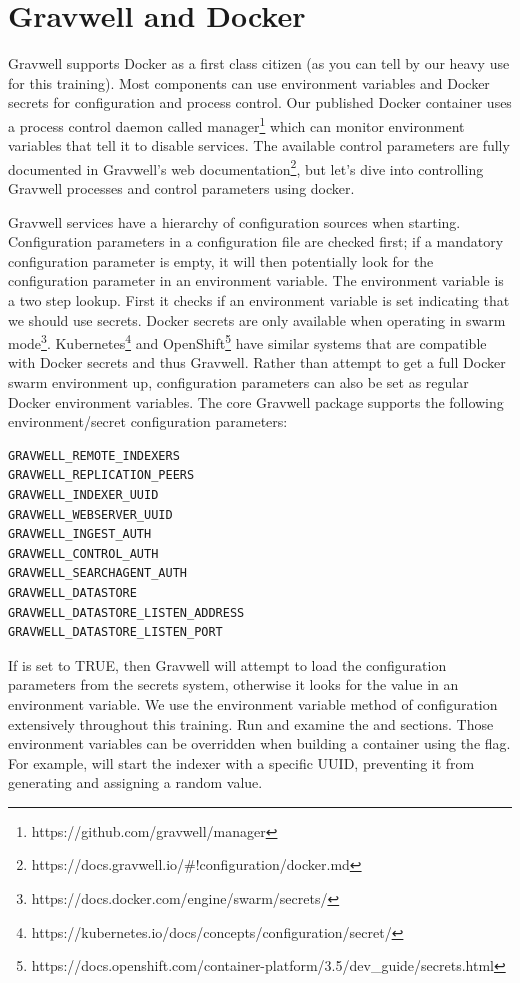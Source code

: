 {\section{Gravwell and Docker}
Gravwell supports Docker as a first class citizen (as you can tell by
our heavy use for this training). Most components can use environment
variables and Docker secrets for configuration and process control. Our
published Docker container uses a process control daemon called
manager\footnote{https://github.com/gravwell/manager} which
can monitor environment variables that tell it to disable services. The
available control parameters are fully documented in
Gravwell's web documentation\footnote{https://docs.gravwell.io/\#!configuration/docker.md},
but let's dive into controlling Gravwell processes and control
parameters using docker.

Gravwell services have a hierarchy of configuration sources when
starting. Configuration parameters in a configuration file are checked
first; if a mandatory configuration parameter is empty, it will then
potentially look for the configuration parameter in an environment
variable. The environment variable is a two step lookup. First it
checks if an environment variable is set indicating that we should use
secrets. Docker secrets are only available when operating in swarm
mode\footnote{https://docs.docker.com/engine/swarm/secrets/}.
Kubernetes\footnote{https://kubernetes.io/docs/concepts/configuration/secret/} and
OpenShift\footnote{https://docs.openshift.com/container-platform/3.5/dev\_guide/secrets.html} have
similar systems that are compatible with Docker secrets and thus
Gravwell. Rather than attempt to get a full Docker swarm environment
up, configuration parameters can also be set as regular Docker
environment variables. The core Gravwell package supports the following
environment/secret configuration parameters:

\begin{Verbatim}[breaklines=true]
GRAVWELL_REMOTE_INDEXERS
GRAVWELL_REPLICATION_PEERS
GRAVWELL_INDEXER_UUID
GRAVWELL_WEBSERVER_UUID
GRAVWELL_INGEST_AUTH
GRAVWELL_CONTROL_AUTH
GRAVWELL_SEARCHAGENT_AUTH
GRAVWELL_DATASTORE
GRAVWELL_DATASTORE_LISTEN_ADDRESS
GRAVWELL_DATASTORE_LISTEN_PORT
\end{Verbatim}

If  is set to TRUE, then Gravwell
will attempt to load the configuration parameters from the secrets
system, otherwise it looks for the value in an environment variable. We
use the environment variable method of configuration extensively
throughout this training. Run  and
examine the  and  sections. Those environment
variables can be overridden when building a container using
the  flag. For example,  will start the indexer with a specific UUID, preventing
it from generating and assigning a random value.

}
